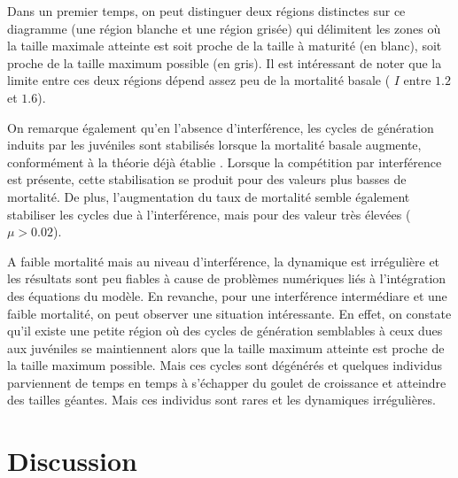 Dans un premier temps, on peut distinguer deux régions distinctes sur ce
diagramme (une région blanche et une région grisée) qui délimitent les zones où
la taille maximale atteinte est soit proche de la taille à maturité (en blanc),
soit proche de la taille maximum possible (en gris). Il est intéressant de noter
que la limite entre ces deux régions dépend assez peu de la mortalité basale
( $I$ entre $1.2$ et $1.6$).

On remarque également qu'en l'absence d'interférence, les cycles de génération
induits par les juvéniles sont stabilisés lorsque la mortalité basale augmente,
conformément à la théorie déjà établie \autocites{de-roos1997a}. Lorsque la
compétition par interférence est présente, cette stabilisation se produit pour
des valeurs plus basses de mortalité. De plus, l'augmentation du taux de
mortalité semble également stabiliser les cycles due à l'interférence, mais pour
des valeur très élevées ($\mu > 0.02$). 

A faible mortalité mais au niveau d'interférence, la dynamique est irrégulière
et les résultats sont peu fiables à cause de problèmes numériques liés à
l'intégration des équations du modèle. En revanche, pour une interférence
intermédiare et une faible mortalité, on peut observer une situation
intéressante. En effet, on constate qu'il existe une petite région où des cycles
de génération semblables à ceux dues aux juvéniles se maintiennent alors que la
taille maximum atteinte est proche de la taille maximum possible. Mais ces
cycles sont dégénérés et quelques individus parviennent de temps en temps à
s'échapper du goulet de croissance et atteindre des tailles géantes. Mais ces
individus sont rares et les dynamiques irrégulières. 

\section{Discussion}

